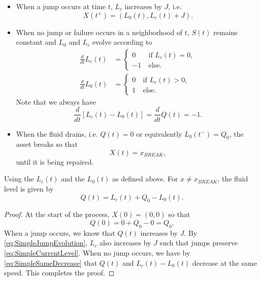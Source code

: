 \begin{itemize}
	\item When a jump occurs at time $t$, $L_c$ increases by $J$, i.e.
	\begin{equation}\label{eq:SimpleJumpEvolution}
	X(t^+)=(L_0(t),L_c(t)+J).
	\end{equation}
	\item When no jump or failure occurs in a neighborhood of $t$, $S(t)$ remains constant and $L_0$ and $L_c$ evolve according to
		\begin{equation}\label{eq:SimpleAgeEvolution}
		\begin{split}
		\frac{d}{dt}L_c(t)&=\begin{cases}
		0&\ \text{if }L_c(t)=0,\\
		-1&\ \text{else.}
		\end{cases}\\
		\frac{d}{dt}L_0(t)&=\begin{cases}
		0&\ \text{if }L_c(t)>0,\\
		1&\ \text{else.}
		\end{cases}
		\end{split}
		\end{equation}
		Note that we always have
		\begin{equation}\label{eq:SimpleSameDecrease}
		\frac{d}{dt}\left[L_c(t)-L_0(t)\right]=\frac{d}{dt}Q(t)=-1.
		\end{equation}
	\item When the fluid drains, i.e. $Q(t)=0$ or equivalently $L_0(t^-)=Q_0$, the asset breaks so that
	\[
	X(t)=x_{BREAK},
	\]
	until it is being repaired.
\end{itemize}
\begin{theorem}\label{theorem:SimpleCurrentLevel}
	Using the $L_c(t)$ and the $L_0(t)$ as defined above.
	For $x\neq x_{BREAK}$, the fluid level is given by
	\begin{equation}\label{eq:SimpleCurrentLevel}
	Q(t)=L_c(t)+Q_0-L_0(t).
	\end{equation}
	\begin{proof}
		At the start of the process, $X(0)=(0,0)$ so that
		\[
		Q(0)=0+Q_0-0=Q_0.
		\]
		When a jump occurs, we know that $Q(t)$ increases by $J$.
		By \eqref{eq:SimpleJumpEvolution}, $L_c$ also increases by $J$ such that jumps preserve \eqref{eq:SimpleCurrentLevel}.
		When no jump occurs, we have by \eqref{eq:SimpleSameDecrease} that $Q(t)$ and $L_c(t)-L_0(t)$ decrease at the same speed.
		This completes the proof.
	\end{proof}
\end{theorem}

